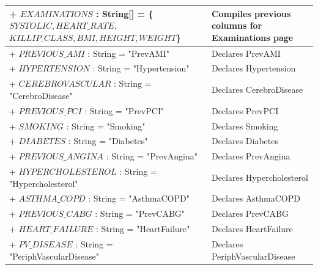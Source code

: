 \documentclass[12pt,a4paper,oneside,titlepage]{article}
\begin{document}
\begin{center}
\begin{tabular}{| p{13cm} | p{5cm} |}
	+ \underline{$EXAMINATIONS$} : String[] = \{$SYSTOLIC, HEART\_RATE, $ $ KILLIP\_CLASS, BMI, HEIGHT, WEIGHT$\} & Compiles previous columns for Examinations page \\ \hline
	+ \underline{$PREVIOUS\_AMI$} : String = "PrevAMI" & Declares PrevAMI \\ \hline
	+ \underline{$HYPERTENSION$} : String = "Hypertension" & Declares Hypertension \\ \hline
	+ \underline{$CEREBROVASCULAR$} : String = "CerebroDisease" & Declares CerebroDisease \\ \hline
	+ \underline{$PREVIOUS\_PCI$} : String = "PrevPCI" & Declares PrevPCI \\ \hline
	+ \underline{$SMOKING$} : String = "Smoking" & Declares Smoking \\ \hline
	+ \underline{$DIABETES$} : String = "Diabetes" & Declares Diabetes \\ \hline
	+ \underline{$PREVIOUS\_ANGINA$} : String = "PrevAngina" & Declares PrevAngina \\ \hline
	+ \underline{$HYPERCHOLESTEROL$} : String = "Hypercholesterol" & Declares Hypercholesterol \\ \hline
	+ \underline{$ASTHMA\_COPD$} : String = "AsthmaCOPD" & Declares AsthmaCOPD \\ \hline
	+ \underline{$PREVIOUS\_CABG$} : String = "PrevCABG" & Declares PrevCABG \\ \hline
	+ \underline{$HEART\_FAILURE$} : String = "HeartFailure" & Declares HeartFailure \\ \hline
	+ \underline{$PV\_DISEASE$} : String = "PeriphVascularDisease" & Declares PeriphVascularDisease \\ \hline
		\end{tabular}
\end{center}
	
\end{document}
